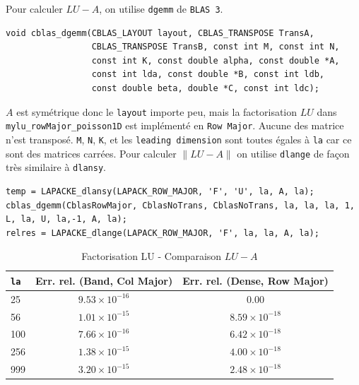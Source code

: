 \documentclass{article}
\begin{document}
Pour calculer $LU-A$, on utilise \texttt{dgemm} de \texttt{BLAS 3}.
\begin{scriptsize}
\begin{verbatim}
void cblas_dgemm(CBLAS_LAYOUT layout, CBLAS_TRANSPOSE TransA,
                 CBLAS_TRANSPOSE TransB, const int M, const int N,
                 const int K, const double alpha, const double *A,
                 const int lda, const double *B, const int ldb,
                 const double beta, double *C, const int ldc);
\end{verbatim}
\end{scriptsize}
$A$ est symétrique donc le \texttt{layout} importe peu, mais la factorisation $LU$ dans \texttt{mylu\_rowMajor\_poisson1D} est implémenté en \texttt{Row Major}. Aucune des matrice n'est transposé. \texttt{M}, \texttt{N}, \texttt{K}, et les \texttt{leading dimension} sont toutes égales à \texttt{la} car ce sont des matrices carrées.  
Pour calculer \( \lVert LU-A \rVert \) on utilise \texttt{dlange} de façon très similaire à \texttt{dlansy}.
\begin{scriptsize}
\begin{verbatim}
temp = LAPACKE_dlansy(LAPACK_ROW_MAJOR, 'F', 'U', la, A, la);
cblas_dgemm(CblasRowMajor, CblasNoTrans, CblasNoTrans, la, la, la, 1, L, la, U, la,-1, A, la);
relres = LAPACKE_dlange(LAPACK_ROW_MAJOR, 'F', la, la, A, la);
\end{verbatim}
\end{scriptsize}\begin{table}[H]
\caption{Factorisation LU - Comparaison $LU - A$}
\centering
\renewcommand*\arraystretch{1.1}
\begin{tabular}{|l|c|c|}
  \hline
  \texttt{la} & Err. rel. (Band, Col Major) & Err. rel. (Dense, Row Major) \\
  \hline
	25	&	\(9.53 \times 10^{-16}\)	&	\(0.00\) \\
	56	&	\(1.01 \times 10^{-15}\)	&	\(8.59 \times 10^{-18}\) \\
	100	&	\(7.66 \times 10^{-16}\)	&	\(6.42 \times 10^{-18}\) \\
	256	&	\(1.38 \times 10^{-15}\)	&	\(4.00 \times 10^{-18}\) \\
	999	&	\(3.20 \times 10^{-15}\)	&	\(2.48 \times 10^{-18}\) \\
  \hline
\end{tabular}
\end{table}
\end{document}
